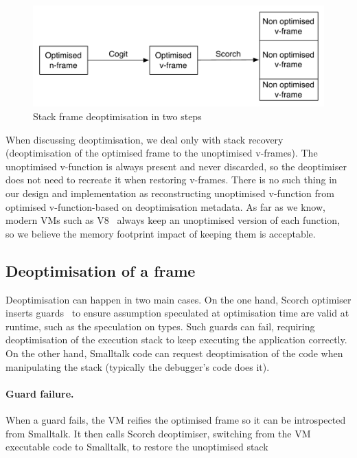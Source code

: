\documentclass[a4paper,12pt,twoside]{../includes/ThesisStyle}
\begin{document}
\begin{figure}[h!]
    \begin{center}
        \includegraphics[width=0.8\linewidth]{SFDeoptimisation}
        \caption{Stack frame deoptimisation in two steps}
        \label{fig:SFDeoptimisation}
    \end{center}
\end{figure}

When discussing deoptimisation, we deal only with stack recovery (deoptimisation of the optimised frame to the unoptimised v-frames). The unoptimised v-function is always present and never discarded, so the deoptimiser does not need to recreate it when restoring v-frames. There is no such thing in our design and implementation as reconstructing unoptimised v-function from optimised v-function-based on deoptimisation metadata. As far as we know, modern VMs such as V8~\cite{V8} always keep an unoptimised version of each function, so we believe the memory footprint impact of keeping them is acceptable.

\subsection{Deoptimisation of a frame}

Deoptimisation can happen in two main cases. On the one hand, Scorch optimiser inserts guards~\cite{Holz92a} to ensure assumption speculated at optimisation time are valid at runtime, such as the speculation on types. Such guards can fail, requiring deoptimisation of the execution stack to keep executing the application correctly. On the other hand, Smalltalk code can request deoptimisation of the code when manipulating the stack (typically the debugger's code does it).

\paragraph{Guard failure.} When a guard fails, the VM reifies the optimised frame so it can be introspected from Smalltalk. It then calls Scorch deoptimiser, switching from the VM executable code to Smalltalk, to restore the unoptimised stack
\end{document}

